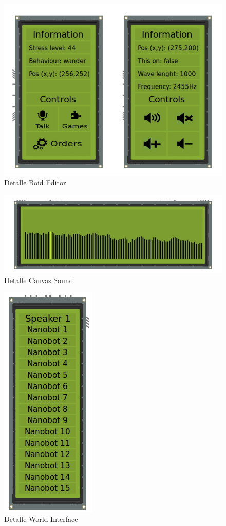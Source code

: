 \begin{figure}[H]
 \centering
 \includegraphics[scale=0.3]{../images/boid_editor.png}
 \caption{Detalle Boid Editor}

 \label{fig:../images/boid_editor.png}
\end{figure}

\begin{figure}[H]
 \centering
 \includegraphics[scale=0.4]{../images/canvas_sound.png}
 \caption{Detalle Canvas Sound}

 \label{fig:../images/canvas_sound.png}
\end{figure}

\begin{figure}[H]
 \centering
 \includegraphics[scale=0.3]{../images/world_interface.png}
 \caption{Detalle World Interface}

 \label{fig:../images/world_interface.png}
\end{figure}
